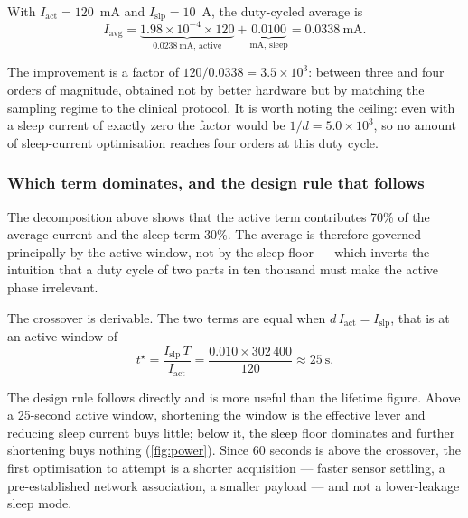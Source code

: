 \documentclass[12pt,a4paper,oneside]{report}
\begin{document}
With $I_{\text{act}} = 120$~mA and $I_{\text{slp}} = 10$~\textmu A, the duty-cycled average is
\begin{equation}
  I_{\text{avg}} = \underbrace{1.98\times10^{-4} \times 120}_{0.0238~\text{mA, active}}
  + \underbrace{0.0100}_{\text{mA, sleep}} = 0.0338~\text{mA}.
\end{equation}

The improvement is a factor of $120/0.0338 = 3.5 \times 10^3$: between three and four orders of magnitude, obtained not by better hardware but by matching the sampling regime to the clinical protocol. It is worth noting the ceiling: even with a sleep current of exactly zero the factor would be $1/d = 5.0\times10^3$, so no amount of sleep-current optimisation reaches four orders at this duty cycle.

\subsubsection{Which term dominates, and the design rule that follows}\label{sec:power-crossover}

The decomposition above shows that the active term contributes 70\% of the average current and the sleep term 30\%. The average is therefore governed principally by the active window, not by the sleep floor --- which inverts the intuition that a duty cycle of two parts in ten thousand must make the active phase irrelevant.

The crossover is derivable. The two terms are equal when $d\,I_{\text{act}} = I_{\text{slp}}$, that is at an active window of
\begin{equation}
  t^\star = \frac{I_{\text{slp}}\,T}{I_{\text{act}}}
  = \frac{0.010 \times 302\,400}{120} \approx 25~\text{s}.
\end{equation}

The design rule follows directly and is more useful than the lifetime figure. Above a 25-second active window, shortening the window is the effective lever and reducing sleep current buys little; below it, the sleep floor dominates and further shortening buys nothing (\cref{fig:power}). Since 60 seconds is above the crossover, the first optimisation to attempt is a shorter acquisition --- faster sensor settling, a pre-established network association, a smaller payload --- and not a lower-leakage sleep mode.
\end{document}
